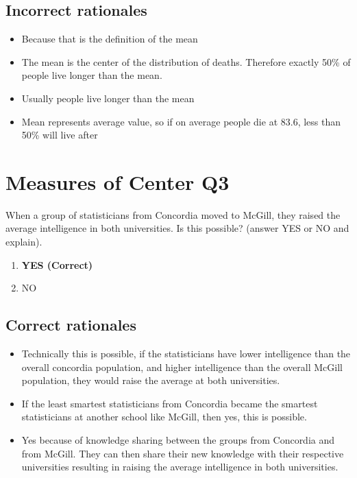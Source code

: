 \documentclass[letterpaper,10pt,twoside,printwatermark=false]{pinp}
\providecommand{\tightlist}{%
  \setlength{\itemsep}{0pt}\setlength{\parskip}{0pt}}
\begin{document}
\subsection{Incorrect rationales}\label{incorrect-rationales}

\begin{itemize}
\tightlist
\item
  Because that is the definition of the mean
\item
  The mean is the center of the distribution of deaths. Therefore
  exactly 50\% of people live longer than the mean.
\item
  Usually people live longer than the mean
\item
  Mean represents average value, so if on average people die at 83.6,
  less than 50\% will live after
\end{itemize}

\section{Measures of Center Q3}\label{measures-of-center-q3}

When a group of statisticians from Concordia moved to McGill, they
raised the average intelligence in both universities. Is this possible?
(answer YES or NO and explain).

\begin{enumerate}
\def\labelenumi{\alph{enumi})}
\tightlist
\item
  \textbf{YES (Correct)}
\item
  NO
\end{enumerate}

\subsection{Correct rationales}\label{correct-rationales-1}

\begin{itemize}
\tightlist
\item
  Technically this is possible, if the statisticians have lower
  intelligence than the overall concordia population, and higher
  intelligence than the overall McGill population, they would raise the
  average at both universities.
\item
  If the least smartest statisticians from Concordia became the smartest
  statisticians at another school like McGill, then yes, this is
  possible.
\item
  Yes because of knowledge sharing between the groups from Concordia and
  from McGill. They can then share their new knowledge with their
  respective universities resulting in raising the average intelligence
  in both universities.
\end{itemize}
\end{document}
